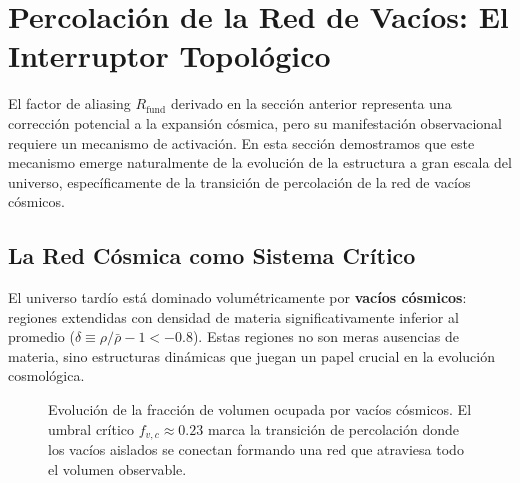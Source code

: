 \documentclass[12pt, a4paper]{article}
\theoremstyle{plain}
\theoremstyle{definition}
\begin{document}
\section{Percolación de la Red de Vacíos: El Interruptor Topológico}
\label{sec:percolacion}

El factor de aliasing $R_{\text{fund}}$ derivado en la sección anterior representa una corrección potencial a la expansión cósmica, pero su manifestación observacional requiere un mecanismo de activación. En esta sección demostramos que este mecanismo emerge naturalmente de la evolución de la estructura a gran escala del universo, específicamente de la transición de percolación de la red de vacíos cósmicos.

\subsection{La Red Cósmica como Sistema Crítico}

El universo tardío está dominado volumétricamente por \textbf{vacíos cósmicos}: regiones extendidas con densidad de materia significativamente inferior al promedio ($\delta \equiv \rho/\bar{\rho} - 1 < -0.8$). Estas regiones no son meras ausencias de materia, sino estructuras dinámicas que juegan un papel crucial en la evolución cosmológica.

\begin{figure}[h]
\centering
{}
\caption{Evolución de la fracción de volumen ocupada por vacíos cósmicos. El umbral crítico $f_{v,c} \approx 0.23$ marca la transición de percolación donde los vacíos aislados se conectan formando una red que atraviesa todo el volumen observable.}
\label{fig:fv_evolution}
\end{figure}
\end{document}
